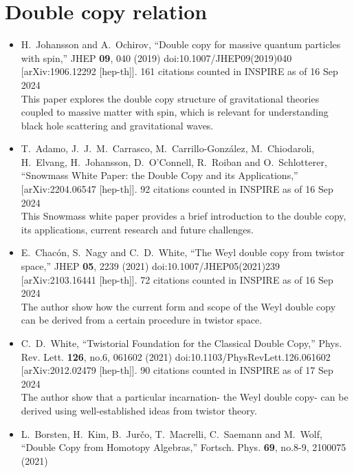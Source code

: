 \documentclass[a4paper,12pt]{article}
\begin{document}
\section*{Double copy relation}
\begin{itemize}
    \item %
    H.~Johansson and A.~Ochirov,
    ``Double copy for massive quantum particles with spin,''
    JHEP \textbf{09}, 040 (2019)
    doi:10.1007/JHEP09(2019)040
    [arXiv:1906.12292 [hep-th]].
    161 citations counted in INSPIRE as of 16 Sep 2024\\
    This paper explores the double copy structure of gravitational theories coupled to massive matter with spin, which is relevant for understanding black hole scattering and gravitational waves.
    \item %
    T.~Adamo, J.~J.~M.~Carrasco, M.~Carrillo-Gonz\'alez, M.~Chiodaroli, H.~Elvang, H.~Johansson, D.~O'Connell, R.~Roiban and O.~Schlotterer,
    ``Snowmass White Paper: the Double Copy and its Applications,''
    [arXiv:2204.06547 [hep-th]].
    92 citations counted in INSPIRE as of 16 Sep 2024\\
    This Snowmass white paper provides a brief introduction to the double copy, its applications,
    current research and future challenges.
    \item %
    E.~Chac\'on, S.~Nagy and C.~D.~White,
    ``The Weyl double copy from twistor space,''
    JHEP \textbf{05}, 2239 (2021)
    doi:10.1007/JHEP05(2021)239
    [arXiv:2103.16441 [hep-th]].
    72 citations counted in INSPIRE as of 16 Sep 2024\\
    The author show how
    the current form and scope of the Weyl double copy can be derived from a certain procedure
    in twistor space.
    \item%
    C.~D.~White,
    ``Twistorial Foundation for the Classical Double Copy,''
    Phys. Rev. Lett. \textbf{126}, no.6, 061602 (2021)
    doi:10.1103/PhysRevLett.126.061602
    [arXiv:2012.02479 [hep-th]].
    90 citations counted in INSPIRE as of 17 Sep 2024\\ 
    The author
    show that a particular incarnation- the Weyl double copy- can be derived using well-established
    ideas from twistor theory.
    \item %
    L.~Borsten, H.~Kim, B.~Jur\v{c}o, T.~Macrelli, C.~Saemann and M.~Wolf,
    ``Double Copy from Homotopy Algebras,''
    Fortsch. Phys. \textbf{69}, no.8-9, 2100075 (2021)

\end{itemize}
\end{document}

